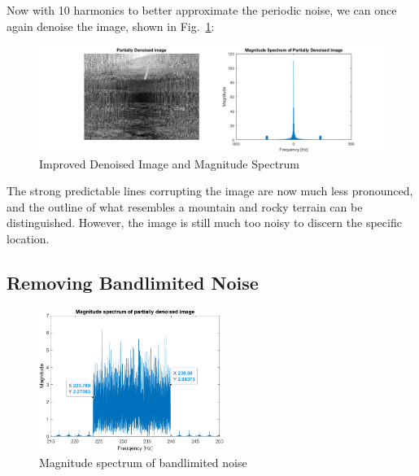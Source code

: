 \documentclass[12pt]{article}
\numberwithin{equation}{section}
\numberwithin{figure}{section}
\numberwithin{table}{section}
\begin{document}
Now with 10 harmonics to better approximate the periodic noise, we can once
again denoise the image, shown in Fig.~\ref{fig:p2-im1improved}:

\begin{figure}[ht]
    \centering
    \includegraphics{figures/p2-im1improved.png}
    \caption{Improved Denoised Image and Magnitude Spectrum\label{fig:p2-im1improved}}
\end{figure}

The strong predictable lines corrupting the image are now much less pronounced,
and the outline of what resembles a mountain and rocky terrain can be
distinguished. However, the image is still much too noisy to discern the
specific location. \pagebreak
\subsection{Removing Bandlimited Noise}

\begin{figure}
    \vspace*{-12pt}
    \centering
    \includegraphics[width=6cm]{figures/p2-bandnoise.png}
    \caption{Magnitude spectrum of bandlimited noise\label{fig:p2-bandnoise}}
\end{figure}
\end{document}
